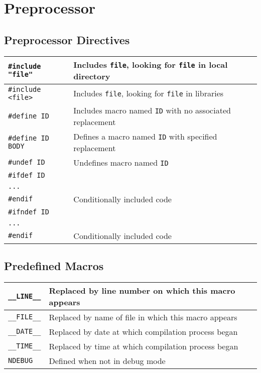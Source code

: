 \chapter{Preprocessor}

\section{Preprocessor Directives}
\begin{center}
  \begin{tabular}{ll}
    \verb'#include "file"' & Includes {\tt file}, looking for {\tt file} in local directory \\
    \midrule
    \verb'#include <file>' & Includes {\tt file}, looking for {\tt file} in libraries \\
    \midrule
    \verb'#define ID'      & Includes macro named {\tt ID} with no associated replacement \\
    \midrule
    \verb'#define ID BODY' & Defines a macro named {\tt ID} with specified replacement \\
    \midrule
    \verb'#undef ID'       & Undefines macro named {\tt ID} \\
    \midrule
    \verb'#ifdef ID' \\
    \verb'...' \\
    \verb'#endif'          & Conditionally included code \\
    \midrule
    \verb'#ifndef ID' \\
    \verb'...' \\
    \verb'#endif'          & Conditionally included code \\
  \end{tabular}
\end{center}

\section{Predefined Macros}
\begin{center}
  \begin{tabular}{ll}
    \verb'__LINE__' & Replaced by line number on which this macro appears \\
    \midrule
    \verb'__FILE__' & Replaced by name of file in which this macro appears \\
    \midrule
    \verb'__DATE__' & Replaced by date at which compilation process began \\
    \midrule
    \verb'__TIME__' & Replaced by time at which compilation process began \\
    \midrule
    \verb'NDEBUG' & Defined when not in debug mode \\
  \end{tabular}
\end{center}



